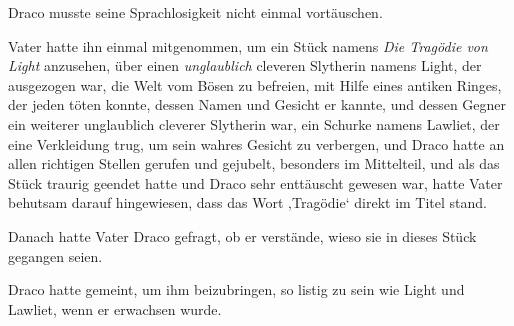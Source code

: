 Draco musste seine Sprachlosigkeit nicht einmal vortäuschen.

Vater hatte ihn einmal mitgenommen, um ein Stück namens \emph{Die Tragödie von Light} anzusehen, über einen \emph{unglaublich} cleveren Slytherin namens Light, der ausgezogen war, die Welt vom Bösen zu befreien, mit Hilfe eines antiken Ringes, der jeden töten konnte, dessen Namen und Gesicht er kannte, und dessen Gegner ein weiterer unglaublich cleverer Slytherin war, ein Schurke namens Lawliet, der eine Verkleidung trug, um sein wahres Gesicht zu verbergen, und Draco hatte an allen richtigen Stellen gerufen und gejubelt, besonders im Mittelteil, und als das Stück traurig geendet hatte und Draco sehr enttäuscht gewesen war, hatte Vater behutsam darauf hingewiesen, dass das Wort ‚Tragödie‘ direkt im Titel stand.

Danach hatte Vater Draco gefragt, ob er verstände, wieso sie in dieses Stück gegangen seien.

Draco hatte gemeint, um ihm beizubringen, so listig zu sein wie Light und Lawliet, wenn er erwachsen wurde.

